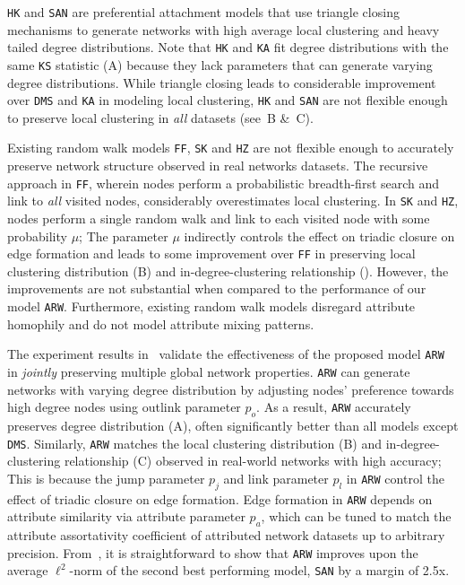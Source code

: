 \texttt{HK} and \texttt{SAN} are preferential attachment models
that use triangle closing mechanisms to generate networks with high average
local clustering and heavy tailed degree distributions.
Note that \texttt{HK} and \texttt{KA} fit degree distributions with the same \texttt{KS} statistic
(A) because they lack parameters that can generate varying degree distributions.
While triangle closing leads to considerable improvement over \texttt{DMS}
and \texttt{KA} in modeling local clustering, \texttt{HK} and \texttt{SAN} are not flexible enough
to preserve local clustering in \textit{all} datasets (see~B \&~C).

Existing random walk models \texttt{FF}, \texttt{SK} and \texttt{HZ}
are not flexible enough to accurately preserve network structure observed in real networks datasets.
The recursive approach in \texttt{FF}, wherein nodes perform a probabilistic breadth-first search
and link to \textit{all} visited nodes, considerably overestimates local clustering.
In \texttt{SK} and \texttt{HZ}, nodes perform a single random walk and link to
each visited node with some probability $\mu$; The parameter $\mu$ indirectly
controls the effect on triadic closure on edge formation
and leads to some improvement over \texttt{FF} in preserving local
clustering distribution (B) and in-degree-clustering relationship (). However, the improvements are not substantial when compared to the performance
of our model \texttt{ARW}. Furthermore, existing random walk models disregard attribute homophily
and do not model attribute mixing patterns.

The experiment results in~ validate the effectiveness
of the proposed model \texttt{ARW} in \textit{jointly} preserving multiple
global network properties. \texttt{ARW} can generate networks with varying
degree distribution by adjusting nodes' preference towards high degree nodes
using outlink parameter $p_o$. As a result, \texttt{ARW} accurately preserves
degree distribution (A), often significantly better
than all models except \texttt{DMS}. Similarly, \texttt{ARW} matches the local clustering
distribution  (B) and in-degree-clustering relationship
(C) observed in real-world networks with high accuracy;
This is because the jump parameter $p_j$ and link parameter $p_l$ in \texttt{ARW}
control the effect of triadic closure on edge formation. Edge formation in \texttt{ARW}
depends on attribute similarity via attribute parameter $p_a$, which can be tuned to
match the attribute assortativity coefficient of attributed network datasets up to
arbitrary precision. From~, it is straightforward to show that \texttt{ARW} improves upon the average $\ell^2$-norm of the second best performing model,
\texttt{SAN} by a margin of 2.5x.


